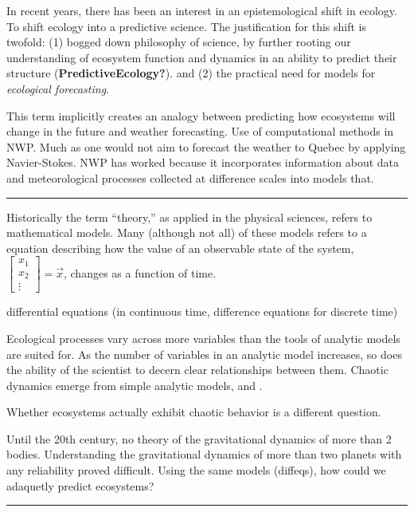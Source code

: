 \documentclass[10pt,oneside]{article}
\begin{document}
In recent years, there has been an interest in an epistemological shift
in ecology. To shift ecology into a predictive science. The
justification for this shift is twofold: (1) bogged down philosophy of
science, by further rooting our understanding of ecosystem function and
dynamics in an ability to predict their structure
(\textbf{PredictiveEcology?}). and (2) the practical need for models for
\emph{ecological forecasting}.

This term implicitly creates an analogy between predicting how
ecosystems will change in the future and weather forecasting. Use of
computational methods in NWP. Much as one would not aim to forecast the
weather to Quebec by applying Navier-Stokes. NWP has worked because it
incorporates information about data and meteorological processes
collected at difference scales into models that.

\begin{center}\rule{0.5\linewidth}{0.5pt}\end{center}

Historically the term ``theory,'' as applied in the physical sciences,
refers to mathematical models. Many (although not all) of these models
refers to a equation describing how the value of an observable state of
the system,
\(\begin{bmatrix}x_1 \\ x_2 \\ \vdots \end{bmatrix} = \vec{x}\), changes
as a function of time.

differential equations (in continuous time, difference equations for
discrete time)

Ecological processes vary across more variables than the tools of
analytic models are suited for. As the number of variables in an
analytic model increases, so does the ability of the scientist to decern
clear relationships between them. Chaotic dynamics emerge from simple
analytic models, and .

Whether ecosystems actually exhibit chaotic behavior is a different
question.

Until the 20th century, no theory of the gravitational dynamics of more
than 2 bodies. Understanding the gravitational dynamics of more than two
planets with any reliability proved difficult. Using the same models
(diffeqs), how could we adaquetly predict ecosystems?

\begin{center}\rule{0.5\linewidth}{0.5pt}\end{center}
\end{document}
